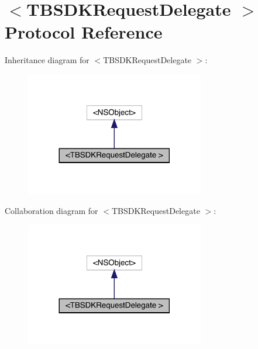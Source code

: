 \hypertarget{protocol_t_b_s_d_k_request_delegate_01-p}{}\section{$<$T\+B\+S\+D\+K\+Request\+Delegate $>$ Protocol Reference}
\label{protocol_t_b_s_d_k_request_delegate_01-p}


Inheritance diagram for $<$T\+B\+S\+D\+K\+Request\+Delegate $>$\+:\nopagebreak
\begin{figure}[H]
\begin{center}
\leavevmode
\includegraphics[width=221pt]{protocol_t_b_s_d_k_request_delegate_01-p__inherit__graph}
\end{center}
\end{figure}


Collaboration diagram for $<$T\+B\+S\+D\+K\+Request\+Delegate $>$\+:\nopagebreak
\begin{figure}[H]
\begin{center}
\leavevmode
\includegraphics[width=221pt]{protocol_t_b_s_d_k_request_delegate_01-p__coll__graph}
\end{center}
\end{figure}
